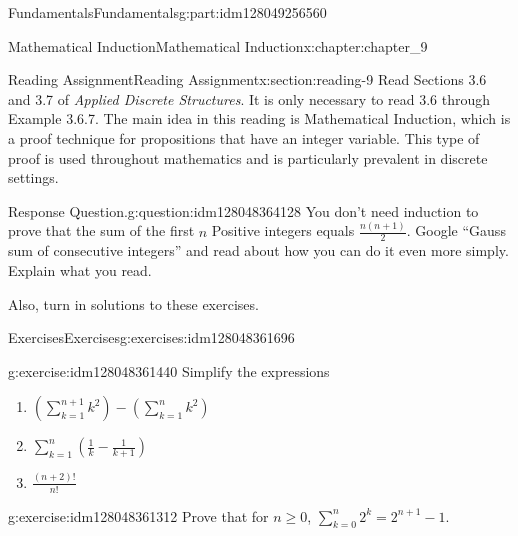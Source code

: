 \documentclass[oneside,10pt,]{book}
\numberwithin{equation}{section}
\begin{document}
\begin{partptx}{Fundamentals}{}{Fundamentals}{}{}{g:part:idm128049256560}
\begin{chapterptx}{Mathematical Induction}{}{Mathematical Induction}{}{}{x:chapter:chapter_9}
\index{}%
%
%
\typeout{************************************************}
\typeout{************************************************}
%
\begin{sectionptx}{Reading Assignment}{}{Reading Assignment}{}{}{x:section:reading-9}
Read Sections 3.6 and 3.7 of \emph{Applied Discrete Structures}. It is only necessary to read 3.6 through Example 3.6.7.   The main idea in this reading is Mathematical Induction, which is a proof technique for propositions that have an integer variable.  This type of proof is used throughout mathematics and is particularly prevalent in discrete settings.%
\begin{question}{Response Question.}{g:question:idm128048364128}%
You don’t need induction to prove that the sum of the first \(n\) Positive integers equals \(\frac{n(n+1)}{2}\). Google “Gauss sum of consecutive integers” and read about how you can do it even more simply. Explain what you read.%
\end{question}
Also, turn in solutions to these exercises.%
%
%
\typeout{************************************************}
\typeout{************************************************}
%
\begin{exercises-subsection}{Exercises}{}{Exercises}{}{}{g:exercises:idm128048361696}
\par\medskip\noindent%
%
\begin{exercisegroup}
\begin{divisionexerciseeg}{1}{}{}{g:exercise:idm128048361440}%
Simplify the expressions%
\begin{enumerate}[label=(\alph*)]
\item{}\(\displaystyle (\sum_{k=1}^{n+1}k^2) -(\sum_{k=1}^n k^2)\)%
\item{}\(\displaystyle \sum_{k=1}^n (\frac{1}{k}-\frac{1}{k+1})\)%
\item{}\(\displaystyle \frac{(n+2)!}{n!}\)%
\end{enumerate}
%
\end{divisionexerciseeg}%
\begin{divisionexerciseeg}{2}{}{}{g:exercise:idm128048361312}%
Prove that for \(n \ge 0\), \(\sum_{k=0}^n {2^k} = 2^{n+1}-1\).%
\end{divisionexerciseeg}%
\end{exercisegroup}
\par\medskip\noindent
\end{exercises-subsection}
\end{sectionptx}

\end{chapterptx}
\end{partptx}
\end{document}
